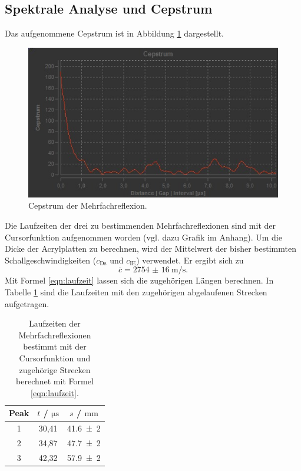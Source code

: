 \subsection{Spektrale Analyse und Cepstrum}
Das aufgenommene Cepstrum ist in Abbildung \ref{fig:cepstrum} dargestellt.
\begin{figure}
  \centering
  \includegraphics[width=\textwidth]{Messdaten/cepstrum.jpg}
  \caption{Cepstrum der Mehrfachreflexion.}
  \label{fig:cepstrum}
\end{figure}
Die Laufzeiten der drei zu bestimmenden Mehrfachreflexionen sind mit der Cursorfunktion
aufgenommen worden (vgl. dazu Grafik im Anhang). Um die Dicke der Acrylplatten zu berechnen, wird der Mittelwert der
bisher bestimmten Schallgeschwindigkeiten ($c_\mathrm{Ds}$ und $c_\mathrm{IE}$) verwendet. Er ergibt sich zu
\begin{equation*}
	\bar{c} = \SI{2754(16)}{\meter\per\second} \mathrm{.}
\end{equation*}
Mit Formel \eqref{eqn:laufzeit} lassen sich die zugehörigen Längen berechnen.
In Tabelle \ref{tab:cepstrum} sind die Laufzeiten mit den zugehörigen abgelaufenen Strecken
aufgetragen.
\begin{table}
\centering
	\caption{Laufzeiten der Mehrfachreflexionen bestimmt mit der Cursorfunktion und zugehörige Strecken berechnet mit Formel \eqref{eqn:laufzeit}.}
\label{tab:cepstrum}
	\begin{tabular}{ccc}
	\toprule
	Peak & $t$ / $\si{\micro\second}$ & $s$ / $\si{\milli\meter}$ \\
	\midrule
		1 & 30,41 & \num{41,6(2)} \\
		2 & 34,87 & \num{47,7(2)} \\
		3 & 42,32 & \num{57,9(2)} \\
	\bottomrule
	\end{tabular}
\end{table}
